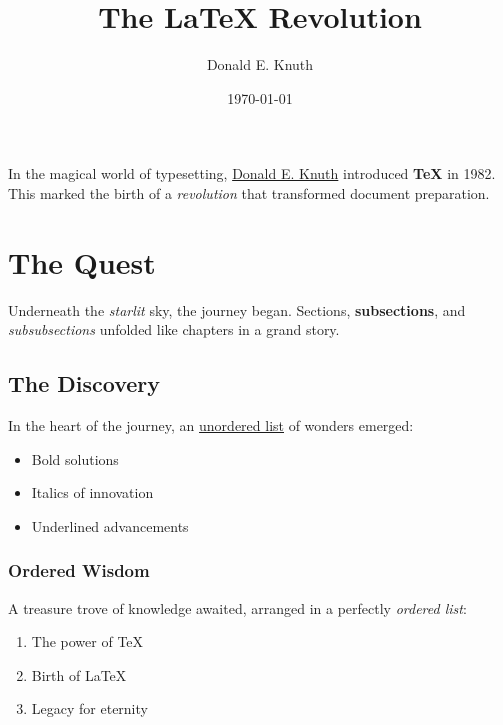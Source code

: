 \documentclass{article}
\title{The LaTeX Revolution}
\author{Donald E. Knuth}
\date{\today}
\begin{document}
	
	\maketitle
	
	In the magical world of typesetting, \underline{Donald E. Knuth} introduced \textbf{TeX} in 1982. This marked the birth of a \textit{revolution} that transformed document preparation.
	
	\section{The Quest}
	Underneath the \textit{starlit} sky, the journey began. \noindent{}Sections, \textbf{subsections}, and \textit{subsubsections} unfolded like chapters in a grand story.
	
	\subsection{The Discovery}
	In the heart of the journey, an \underline{unordered list} of wonders emerged:
	\begin{itemize}
		\item Bold solutions
		\item Italics of innovation
		\item Underlined advancements
	\end{itemize}
	
	\subsubsection{Ordered Wisdom}
	A treasure trove of knowledge awaited, arranged in a perfectly \textit{ordered list}:
	\begin{enumerate}
		\item The power of TeX
		\item Birth of LaTeX
		\item Legacy for eternity
	\end{enumerate}
	
\end{document}
